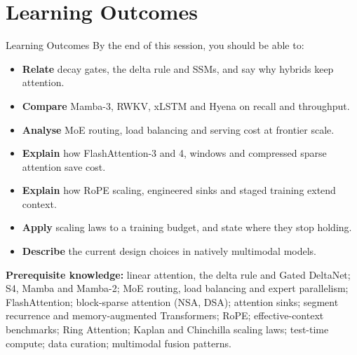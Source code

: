 \section{Learning Outcomes}

\begin{frame}{Learning Outcomes}
    By the end of this session, you should be able to:
    \begin{itemize}\itemsep0.25em
        \item \textbf{Relate} decay gates, the delta rule and SSMs, and say why hybrids keep attention.
        \item \textbf{Compare} Mamba-3, RWKV, xLSTM and Hyena on recall and throughput.
        \item \textbf{Analyse} MoE routing, load balancing and serving cost at frontier scale.
        \item \textbf{Explain} how FlashAttention-3 and 4, windows and compressed sparse attention save cost.
        \item \textbf{Explain} how RoPE scaling, engineered sinks and staged training extend context.
        \item \textbf{Apply} scaling laws to a training budget, and state where they stop holding.
        \item \textbf{Describe} the current design choices in natively multimodal models.
    \end{itemize}
    \vspace{0.4em}
    {\scriptsize \textbf{Prerequisite knowledge:} linear attention, the delta rule and Gated DeltaNet; S4, Mamba and Mamba-2; MoE routing, load balancing and expert parallelism; FlashAttention; block-sparse attention (NSA, DSA); attention sinks; segment recurrence and memory-augmented Transformers; RoPE; effective-context benchmarks; Ring Attention; Kaplan and Chinchilla scaling laws; test-time compute; data curation; multimodal fusion patterns.\par}
\end{frame}
